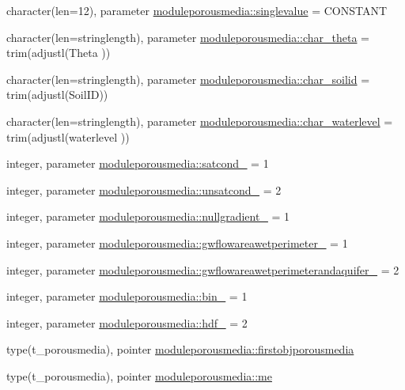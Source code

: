 \begin{DoxyCompactItemize}
character(len=12), parameter \mbox{\hyperlink{namespacemoduleporousmedia_a04422be8d50537a662c44bd12eaca375}{moduleporousmedia\+::singlevalue}} = \textquotesingle{}C\+O\+N\+S\+T\+A\+NT\textquotesingle{}
\item 
character(len=stringlength), parameter \mbox{\hyperlink{namespacemoduleporousmedia_af22fc91889b7575174928fbaace1bf8d}{moduleporousmedia\+::char\+\_\+theta}} = trim(adjustl(\textquotesingle{}Theta\textquotesingle{} ))
\item 
character(len=stringlength), parameter \mbox{\hyperlink{namespacemoduleporousmedia_a06f39391019fe9f68e0830e66d8d30dd}{moduleporousmedia\+::char\+\_\+soilid}} = trim(adjustl(\textquotesingle{}Soil\+ID\textquotesingle{}))
\item 
character(len=stringlength), parameter \mbox{\hyperlink{namespacemoduleporousmedia_a60c5e507d9236adaed3b8caee85cb0ec}{moduleporousmedia\+::char\+\_\+waterlevel}} = trim(adjustl(\textquotesingle{}waterlevel\textquotesingle{} ))
\item 
integer, parameter \mbox{\hyperlink{namespacemoduleporousmedia_aeaa5af14db3a8d6228eac80c7211c516}{moduleporousmedia\+::satcond\+\_\+}} = 1
\item 
integer, parameter \mbox{\hyperlink{namespacemoduleporousmedia_a481df84cb04f10c7675c50d66767c218}{moduleporousmedia\+::unsatcond\+\_\+}} = 2
\item 
integer, parameter \mbox{\hyperlink{namespacemoduleporousmedia_a891aed761f4141d1e05c29c1862dd3e0}{moduleporousmedia\+::nullgradient\+\_\+}} = 1
\item 
integer, parameter \mbox{\hyperlink{namespacemoduleporousmedia_a8bebb0b791a472f99c709f85976dde27}{moduleporousmedia\+::gwflowareawetperimeter\+\_\+}} = 1
\item 
integer, parameter \mbox{\hyperlink{namespacemoduleporousmedia_a73014666c1653e31d4f9322e0b6d07de}{moduleporousmedia\+::gwflowareawetperimeterandaquifer\+\_\+}} = 2
\item 
integer, parameter \mbox{\hyperlink{namespacemoduleporousmedia_afac9099ee4b4a056a09dac528e6d391c}{moduleporousmedia\+::bin\+\_\+}} = 1
\item 
integer, parameter \mbox{\hyperlink{namespacemoduleporousmedia_a08e7e01d3e63f79377cf1be17529922d}{moduleporousmedia\+::hdf\+\_\+}} = 2
\item 
type(t\+\_\+porousmedia), pointer \mbox{\hyperlink{namespacemoduleporousmedia_adce3f6c3cf611a0ec921e0f59f8564fd}{moduleporousmedia\+::firstobjporousmedia}}
\item 
type(t\+\_\+porousmedia), pointer \mbox{\hyperlink{namespacemoduleporousmedia_a3e17aaf8157066d02072051194e1dcb0}{moduleporousmedia\+::me}}
\end{DoxyCompactItemize}
